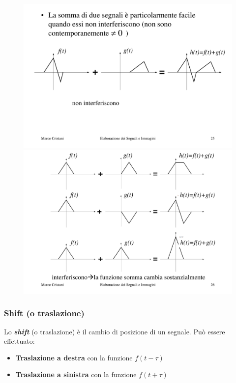 \documentclass[a4paper]{article}
\begin{document}
	\begin{figure}[!htp]
		\centering
		\includegraphics[width=1\textwidth]{img/op_somma_1.pdf}
		\includegraphics[width=1\textwidth]{img/op_somma_2.pdf}
	\end{figure}

	\newpage
	
	\subsubsection{Shift (o traslazione)}
	
	Lo \textbf{\emph{shift}} (o traslazione) è il cambio di posizione di un segnale. Può essere effettuato:
	
	\begin{itemize}
		\item \textbf{Traslazione a destra} con la funzione $f(t-\tau)$
		\item \textbf{Traslazione a sinistra} con la funzione $f(t+\tau)$
	\end{itemize}
	
\end{document}
